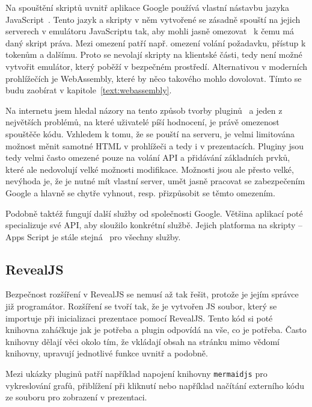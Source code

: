 Na spouštění skriptů uvnitř aplikace Google používá vlastní nástavbu jazyka JavaScript~\cite{google_apps}.
Tento jazyk a skripty v něm vytvořené se zásadně spouští na jejich serverech v emulátoru JavaScriptu tak, aby mohli jasně omezovat~\cite{google_apps} k čemu má daný skript práva. 
Mezi omezení patří např. omezení volání požadavku, přístup k tokenům a dalšímu.
Proto se nevolají skripty na klientské části, tedy není možné vytvořit emulátor, který poběží v bezpečném prostředí.
Alternativou v moderních prohlížečích je WebAssembly, které by něco takového mohlo dovolovat.
Tímto se budu zaobírat v kapitole~\ref{text:webassembly}.

Na internetu jsem hledal názory na tento způsob tvorby pluginů~\cite{google_apps_script_redit} a jeden z největších problémů, na které uživatelé píší hodnocení, je právě omezenost spouštěče kódu.
Vzhledem k tomu, že se pouští na serveru, je velmi limitována možnost měnit samotné HTML v prohlížeči a tedy i v prezentacích.
Pluginy jsou tedy velmi často omezené pouze na volání API a přidávání základních prvků, které ale nedovolují velké možnosti modifikace.
Možnosti jsou ale přesto velké, nevýhoda je, že je nutné mít vlastní server, umět jasně pracovat se zabezpečením Google a hlavně se chytře vyhnout, resp. přizpůsobit se těmto omezením.

Podobně taktéž fungují další služby od společnosti Google.
Většina aplikací poté specializuje své API, aby sloužilo konkrétní službě.
Jejich platforma na skripty -- Apps Script je stále stejná~\cite{google_apps_script_redit, google_apps} pro všechny služby.

\subsection{RevealJS}

Bezpečnost rozšíření v RevealJS se nemusí až tak řešit, protože je jejím správce již programátor.
Rozšíření se tvoří tak, že je vytvořen JS soubor, který se importuje při inicializaci prezentace pomocí RevealJS.
Tento kód si poté knihovna zaháčkuje jak je potřeba a plugin odpovídá na vše, co je potřeba.
Často knihovny dělají věci okolo tím, že vkládají obsah na stránku mimo vědomí knihovny, upravují jednotlivé funkce uvnitř a podobně.

Mezi ukázky pluginů patří například napojení knihovny \texttt{mermaidjs} pro vykreslování grafů, přiblížení při kliknutí nebo například načítání externího kódu ze souboru pro zobrazení v prezentaci.

